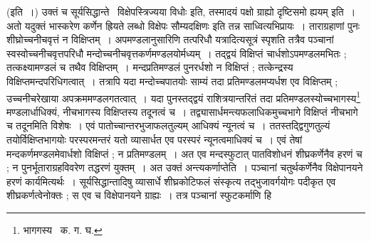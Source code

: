 \documentclass[11pt, openany]{book}
\begin{document}
(इति~।) उक्तं च सूर्यसिद्धान्ते \textendash\ {\qt विक्षेपस्त्रिज्यया विधोः} इति, {\qt तस्मादयं पक्षो ग्राह्यो दृष्टिसमो ह्ययम्} इति~। अतो यदुक्तं भास्करेण {\qt कर्णेन ह्रियते लब्धो विक्षेपः सौम्यदक्षिणः} इति तन्न साध्वित्यभिप्रायः~। ताराग्रहाणां पुनः शीघ्रोच्चनीचवृत्तं न विक्षिप्तम्~। अपमण्डलानुसारिणि तत्परिधौ यत्रादित्यसूत्रं स्पृशति तत्रैव पञ्चानां स्वस्वोच्चनीचवृत्तपरिधौ मन्दोच्चनीचवृत्तकर्णमण्डलयोर्मध्यम्~। तद्द्वयं विक्षिप्तं चार्धशोऽपमण्डलमभितः ; तत्कक्ष्यामण्डलं च तथैव विक्षिप्तम्~। मन्दप्रतिमण्डलं पुनरर्धशो न विक्षिप्तं ; तत्केन्द्रस्य विक्षिप्तमन्दपरिधिगत्वात्~। तत्रापि यदा मन्दोच्चपातयोः साम्यं तदा प्रतिमण्डलमप्यर्धश एव विक्षिप्तम् ; उच्चनीचरेखाया अपक्रममण्डलगतत्वात्~। यदा पुनस्तद्द्वयं राशित्रयान्तरितं तदा प्रतिमण्डलस्योच्चभागस्य\renewcommand{\thefootnote}{१}\footnote{भागगस्य \textendash\ क. ग. घ.} मण्डलार्धाधिक्यं, नीचभागस्य विक्षिप्तस्य तदूनत्वं च~। तद्व्यासार्धमन्त्यफलाधिकमुच्चभागे विक्षिप्तं नीचभागे च तदूनमिति विशेषः~। एवं पातोच्चान्तरभुजाफलतुल्यम् आधिक्यं न्यूनत्वं च~। ततस्तद्द्विगुणतुल्यं तयोर्विक्षिप्तभागयोः परस्परमन्तरं यतो व्यासार्धत एव परस्परं न्यूनत्वमाधिक्यं च~। एवं तेषां मन्दकर्णमण्डलमेवार्धशो विक्षिप्तं ; न प्रतिमण्डलम्~। अत एव मन्दस्फुटात् पातविशोधनं शीघ्रकर्णेनैव हरणं च ; न पुनर्भूताराग्रहविवरेण तद्धरणं युक्तम्~। अत उक्तं {\qt अन्त्यकर्णाप्ते}ति~। पञ्चानां चतुर्थकर्णेनैव विक्षेपानयने हरणं कार्यमित्यर्थः~। सूर्यसिद्धान्तादिषु व्यासार्धे शीघ्रकोटिफलं संस्कृत्य तद्भुजावर्गयोगः पदीकृत एव शीघ्रकर्णत्वेनोक्तः ; स एव च विक्षेपानयने ग्राह्यः~। तत्र पञ्चानां स्फुटकर्माणि हि 

\newpage
\end{document}
